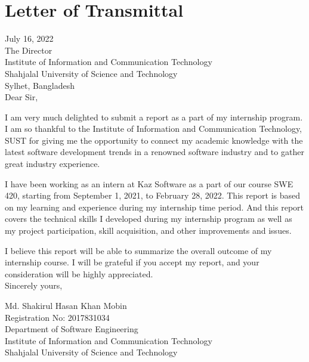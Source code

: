 \chapter*{Letter of Transmittal}

July 16, 2022\\
The Director\\
Institute of Information and Communication Technology\\
Shahjalal University of Science and Technology\\
Sylhet, Bangladesh\\

Dear Sir,

I am very much delighted to submit a report as a part of my internship program.
I am so thankful to the Institute of Information and Communication Technology, SUST for giving me the opportunity to connect my academic knowledge with the latest software development trends in a renowned software industry and to gather great industry experience.

I have been working as an intern at Kaz Software as a part of our course SWE 420, starting from September 1, 2021, to February 28, 2022.
This report is based on my learning and experience during my internship time period. And this report covers the technical skills I developed during my internship program as well as my project participation, skill acquisition, and other improvements and issues.

I believe this report will be able to summarize the overall outcome of my internship course.
I will be grateful if you accept my report, and your consideration will be highly appreciated.\\

Sincerely yours,

\vspace*{60pt}
Md. Shakirul Hasan Khan Mobin\\
Registration No: 2017831034\\
Department of Software Engineering\\
Institute of Information and Communication Technology\\
Shahjalal University of Science and Technology